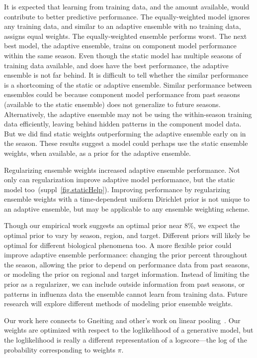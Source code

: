 \documentclass[12pt]{article}
\begin{document}
It is expected that learning from training data, and the amount available, would contribute to better predictive performance.
The equally-weighted model ignores any training data, and similar to an adaptive ensemble with no training data, assigns equal weights.
The equally-weighted ensemble performs worst.
The next best model, the adaptive ensemble, trains on component model performance within the same season.
Even though the static model has multiple seasons of training data available, and does have the best performance, the adaptive ensemble is not far behind.
It is difficult to tell whether the similar performance is a shortcoming of the static or adaptive ensemble.
Similar performance between ensembles could be because component model performance from past seasons (available to the static ensemble) does not generalize to future seasons.
Alternatively, the adaptive ensemble may not be using the within-season training data efficiently, leaving behind hidden patterns in the component model data. 
But we did find static weights outperforming the adaptive ensemble early on in the season.
These results suggest a model could perhaps use the static ensemble weights, when available, as a prior for the adaptive ensemble.

Regularizing ensemble weights increased adaptive ensemble performance.
Not only can regularization improve adaptive model performance, but the static model too~(suppl~\ref{fig.staticHelp}).
Improving performance by regularizing ensemble weights with a time-dependent uniform Dirichlet prior is not unique to an adaptive ensemble, but may be applicable to any ensemble weighting scheme. 

Though our empirical work suggests an optimal prior near 8\%, we expect the optimal prior to vary by season, region, and target.
Different priors will likely be optimal for different biological phenomena too.
%
A more flexible prior could improve adaptive ensemble performance:
changing the prior percent throughout the season, allowing the prior to depend on performance data from past seasons, or modeling the prior on regional and target information.
Instead of limiting the prior as a regularizer, we can include outside information from past seasons, or patterns in influenza data the ensemble cannot learn from training data.
Future research will explore different methods of modeling prior ensemble weights.

Our work here connects to Gneiting and other's work on linear pooling~\cite{ranjan2010combining,gneiting2013combining,geweke2011optimal,wallis2011combining}.
Our weights are optimized with respect to the loglikelihood of a generative model, but the loglikelihood is really a different representation of a logscore---the log of the probability corresponding to weights $\pi$.  
\end{document}
